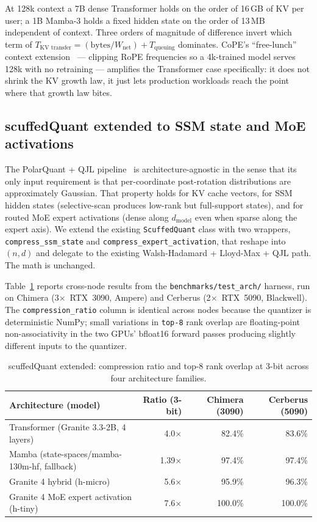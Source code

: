 \documentclass[11pt,letterpaper]{article}
\theoremstyle{definition}
\begin{document}
At 128k context a 7B dense Transformer holds on the order of 16\,GB
of KV per user; a 1B Mamba-3 holds a fixed hidden state on the order
of 13\,MB independent of context. Three orders of magnitude of
difference invert which term of $T_{\text{KV transfer}} =
(\text{bytes}/W_{\text{net}}) + T_{\text{queuing}}$ dominates. CoPE's
``free-lunch'' context extension~\cite{li2026cope} --- clipping
RoPE frequencies so a 4k-trained model serves 128k with no retraining
--- amplifies the Transformer case specifically: it does not shrink
the KV growth law, it just lets production workloads reach the point
where that growth law bites.

\subsection{scuffedQuant extended to SSM state and MoE activations}
\label{sec:sq-ext}

The PolarQuant + QJL pipeline~\cite{zandieh2025turboquant} is
architecture-agnostic in the sense that its only input requirement
is that per-coordinate post-rotation distributions are approximately
Gaussian. That property holds for KV cache vectors, for SSM hidden
states (selective-scan produces low-rank but full-support states),
and for routed MoE expert activations (dense along $d_{\text{model}}$
even when sparse along the expert axis). We extend the existing
\texttt{ScuffedQuant} class with two wrappers,
\texttt{compress\_ssm\_state} and \texttt{compress\_expert\_activation},
that reshape into $(n, d)$ and delegate to the existing
Walsh-Hadamard + Lloyd-Max + QJL path. The math is unchanged.

Table~\ref{tab:sq-ext-results} reports cross-node results from the
\texttt{benchmarks/test\_arch/} harness, run on Chimera
(3$\times$~RTX~3090, Ampere) and Cerberus (2$\times$~RTX~5090,
Blackwell). The \texttt{compression\_ratio} column is identical
across nodes because the quantizer is deterministic NumPy; small
variations in \texttt{top-8} rank overlap are floating-point
non-associativity in the two GPUs' bfloat16 forward passes producing
slightly different inputs to the quantizer.

\begin{table}[htbp]
\centering
\caption{scuffedQuant extended: compression ratio and top-8 rank
overlap at 3-bit across four architecture families.}
\label{tab:sq-ext-results}
\small
\begin{tabular}{lrrr}
\toprule
Architecture (model)                           & Ratio (3-bit) & Chimera (3090) & Cerberus (5090) \\
\midrule
Transformer (Granite 3.3-2B, 4 layers)         & 4.0$\times$   & 82.4\%         & 83.6\%          \\
Mamba (state-spaces/mamba-130m-hf, fallback)   & 1.39$\times$  & 97.4\%         & 97.4\%          \\
Granite 4 hybrid (h-micro)                     & 5.6$\times$   & 95.9\%         & 96.3\%          \\
Granite 4 MoE expert activation (h-tiny)       & 7.6$\times$   & 100.0\%        & 100.0\%         \\
\bottomrule
\end{tabular}
\end{table}
\end{document}
